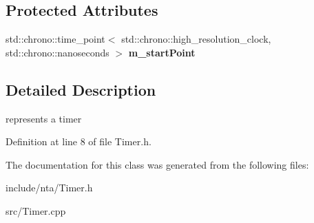 \subsection*{Protected Attributes}
\begin{DoxyCompactItemize}
\item 
\mbox{\label{classnta_1_1Timer_adcd68ad6538a3e36b2f783996796ce56}} 
std\+::chrono\+::time\+\_\+point$<$ std\+::chrono\+::high\+\_\+resolution\+\_\+clock, std\+::chrono\+::nanoseconds $>$ {\bfseries m\+\_\+start\+Point}
\end{DoxyCompactItemize}


\subsection{Detailed Description}
represents a timer 

Definition at line 8 of file Timer.\+h.



The documentation for this class was generated from the following files\+:\begin{DoxyCompactItemize}
\item 
include/nta/Timer.\+h\item 
src/Timer.\+cpp\end{DoxyCompactItemize}
